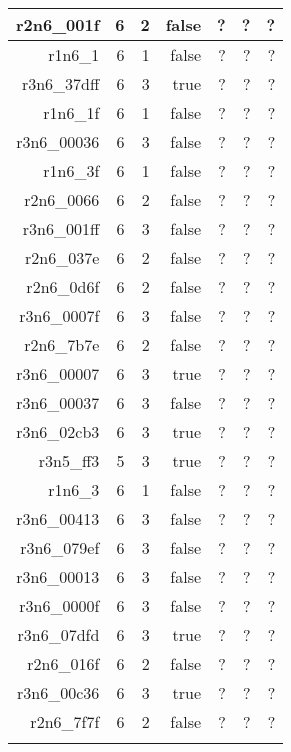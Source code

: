 \begin{center}
\begin{longtable}{rrrrrrr}
  r2n6\_001f & 6 & 2 & false & ? & ? & ? \\ \hline
  r1n6\_1 & 6 & 1 & false & ? & ? & ? \\ \hline
  r3n6\_37dff & 6 & 3 & true & ? & ? & ? \\ \hline
  r1n6\_1f & 6 & 1 & false & ? & ? & ? \\ \hline
  r3n6\_00036 & 6 & 3 & false & ? & ? & ? \\ \hline
  r1n6\_3f & 6 & 1 & false & ? & ? & ? \\ \hline
  r2n6\_0066 & 6 & 2 & false & ? & ? & ? \\ \hline
  r3n6\_001ff & 6 & 3 & false & ? & ? & ? \\ \hline
  r2n6\_037e & 6 & 2 & false & ? & ? & ? \\ \hline
  r2n6\_0d6f & 6 & 2 & false & ? & ? & ? \\ \hline
  r3n6\_0007f & 6 & 3 & false & ? & ? & ? \\ \hline
  r2n6\_7b7e & 6 & 2 & false & ? & ? & ? \\ \hline
  r3n6\_00007 & 6 & 3 & true & ? & ? & ? \\ \hline
  r3n6\_00037 & 6 & 3 & false & ? & ? & ? \\ \hline
  r3n6\_02cb3 & 6 & 3 & true & ? & ? & ? \\ \hline
  r3n5\_ff3 & 5 & 3 & true & ? & ? & ? \\ \hline
  r1n6\_3 & 6 & 1 & false & ? & ? & ? \\ \hline
  r3n6\_00413 & 6 & 3 & false & ? & ? & ? \\ \hline
  r3n6\_079ef & 6 & 3 & false & ? & ? & ? \\ \hline
  r3n6\_00013 & 6 & 3 & false & ? & ? & ? \\ \hline
  r3n6\_0000f & 6 & 3 & false & ? & ? & ? \\ \hline
  r3n6\_07dfd & 6 & 3 & true & ? & ? & ? \\ \hline
  r2n6\_016f & 6 & 2 & false & ? & ? & ? \\ \hline
  r3n6\_00c36 & 6 & 3 & true & ? & ? & ? \\ \hline
  r2n6\_7f7f & 6 & 2 & false & ? & ? & ? \\ \hline
\label{Tab:computational-results} 
\end{longtable}

\end{center}




 
